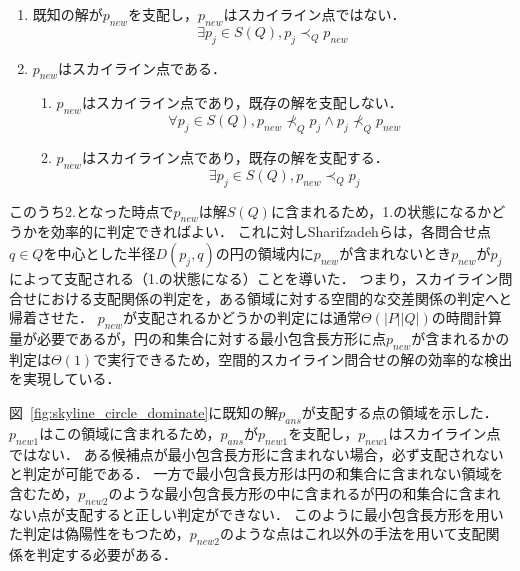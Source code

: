 \documentclass{fit}
\theoremstyle{definition}
\newcommand{\Fig}[1]{図~#1}
\begin{document}
\begin{enumerate}%
  \item 既知の解が$p_{new}$を支配し，$p_{new}$はスカイライン点ではない．
    \begin{equation}
      \label{eq:base:notskyline}
      \exists p_j \in S(Q), p_j \prec_Q p_{new}
    \end{equation}
  \item $p_{new}$はスカイライン点である．
  \begin{enumerate}
    \item $p_{new}$はスカイライン点であり，既存の解を支配しない．
      \begin{equation}
        \label{eq:base:skylinebutnotdominate}
        \forall p_j \in S(Q), p_{new} \nprec_Q p_j \wedge p_j \nprec_Q p_{new}
      \end{equation}
    \item $p_{new}$はスカイライン点であり，既存の解を支配する．
      \begin{equation}
        \label{eq:base:skylineanddominate}
        \exists p_j \in S(Q), p_{new} \prec_Q p_j
      \end{equation}
  \end{enumerate}
\end{enumerate}


このうち2.となった時点で$p_{new}$は解$S(Q)$に含まれるため，1.の状態になるかどうかを効率的に判定できればよい．
これに対しSharifzadehらは，各問合せ点$q \in Q$を中心とした半径$D(p_j,q)$の円の領域内に$p_{new}$が含まれないとき$p_{new}$が$p_j$によって支配される（1.の状態になる）ことを導いた．
つまり，スカイライン問合せにおける支配関係の判定を，ある領域に対する空間的な交差関係の判定へと帰着させた．
$p_{new}$が支配されるかどうかの判定には通常$\Theta(|P||Q|)$の時間計算量が必要であるが，円の和集合に対する最小包含長方形に点$p_{new}$が含まれるかの判定は$\Theta(1)$で実行できるため，空間的スカイライン問合せの解の効率的な検出を実現している．

\Fig{\ref{fig:skyline_circle_dominate}}に既知の解$p_{ans}$が支配する点の領域を示した．
$p_{new1}$はこの領域に含まれるため，$p_{ans}$が$p_{new1}$を支配し，$p_{new1}$はスカイライン点ではない．
ある候補点が最小包含長方形に含まれない場合，必ず支配されないと判定が可能である．
一方で最小包含長方形は円の和集合に含まれない領域を含むため，$p_{new2}$のような最小包含長方形の中に含まれるが円の和集合に含まれない点が支配すると正しい判定ができない．
このように最小包含長方形を用いた判定は偽陽性をもつため，$p_{new2}$のような点はこれ以外の手法を用いて支配関係を判定する必要がある．
\end{document}
